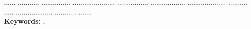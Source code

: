 \begin{spacing}{1.25}
\begin{justify}
\begin{footnotesize}
\noindent
...... ........... ............... ...................... ................ .................. .................... .......... ..... ................... ........... .......\\


\noindent
\textbf{Keywords:} \Keywords .
		\end{footnotesize}
	\end{justify}
\end{spacing}
\newpage